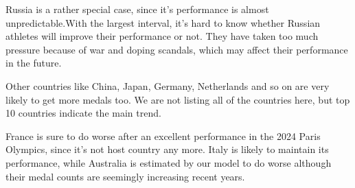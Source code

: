 Russia is a rather special case, since it's performance is almost unpredictable.With the largest interval, it's hard to know whether Russian athletes will improve their performance or not. They have taken too much pressure because of war and doping scandals, which may affect their performance in the future.

Other countries like China, Japan, Germany, Netherlands and so on are very likely to get more medals too. We are not listing all of the countries here, but top 10 countries indicate the main trend.

France is sure to do worse after an excellent performance in the 2024 Paris Olympics, since it's not host country any more. Italy is likely to maintain its performance, while Australia is estimated by our model to do worse although their medal counts are seemingly increasing recent years.